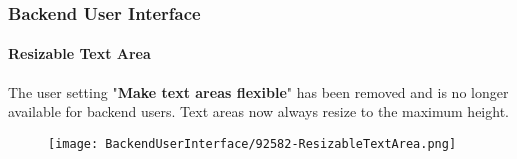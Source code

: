 %

\begin{frame}[fragile]
	\frametitle{Backend User Interface}
	\framesubtitle{Resizable Text Area}

	The user setting "\textbf{Make text areas flexible}" has been removed and is no longer available for backend users.
	Text areas now always resize to the maximum height.

	\begin{figure}
		\texttt{[image: BackendUserInterface/92582-ResizableTextArea.png]}
	\end{figure}

\end{frame}

